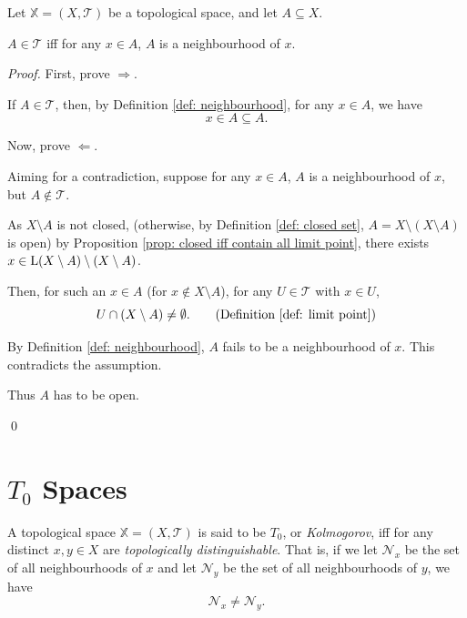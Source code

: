 \begin{proposition}
	Let $\mathbb X = (X, \mathcal T)$ be a topological space, and let $A \subseteq X$.
	
	$A \in \mathcal T$ iff for any $x \in A$, $A$ is a neighbourhood of $x$.
	
	\begin{proof}
		First, prove $\Rightarrow$.
		
		If $A \in \mathcal T$, then, by Definition \ref{def: neighbourhood}, for any $x \in A$, we have
		$$
		x \in A \subseteq A.
		$$
		
		\qedlm
		
		Now, prove $\Leftarrow$.
		
		Aiming for a contradiction, suppose for any $x \in A$, $A$ is a neighbourhood of $x$, but $A\notin \mathcal T$.
		
		As $X \setminus A$ is not closed, (otherwise, by Definition \ref{def: closed set}, $A = X \setminus (X \setminus A)$ is open) by Proposition \ref{prop: closed iff contain all limit point}, there exists $x \in \mathrm{L}(X \setminus A) \setminus (X \setminus A)$.
		
		Then, for such an $x \in A$ (for $x \notin X \setminus A$), for any $U \in \mathcal T$ with $x \in U$,
		$$
		U \cap (X \setminus A) \ne \emptyset. \qquad \text{(Definition \ref{def: limit point})}
		$$
		
		By Definition \ref{def: neighbourhood}, $A$ fails to be a neighbourhood of $x$. This contradicts the assumption.
		
		Thus $A$ has to be open.
		
		\qed
	\end{proof}
\end{proposition}



\section{$T_0$ Spaces}


\begin{definition}
	\label{def: T_0 spaces}
	A topological space $\mathbb X = (X, \mathcal T)$ is said to be $T_0$, or \textit{Kolmogorov}, iff for any distinct $x, y \in X$ are \textit{topologically distinguishable}. That is, if we let $\mathcal N_x$ be the set of all neighbourhoods of $x$ and let $\mathcal N_y$ be the set of all neighbourhoods of $y$, we have
	$$
	\mathcal N_x \ne \mathcal N_y.
	$$
\end{definition}


